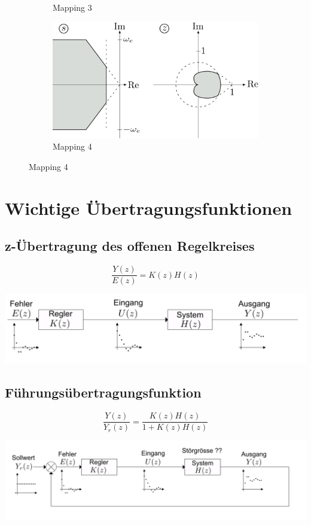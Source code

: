 \begin{figure}[th]
\begin{subfigure}[b]{0.45\textwidth}
		\caption{Mapping 3}
	\end{subfigure}
	\hfill
	\begin{subfigure}[b]{0.45\textwidth}
		\includegraphics[width=\textwidth]{./images/mapping4}
		\caption{Mapping 4}
	\end{subfigure}
\end{figure}

\section{Wichtige Übertragungsfunktionen}
\subsection{z-Übertragung des offenen Regelkreises}
\[
	\frac{Y(z)}{E(z)} = K(z)H(z)
\]
\begin{center}
	\includegraphics[width=.8\textwidth]{./images/rol}
\end{center}

\subsection{Führungsübertragungsfunktion}
\[
	\frac{Y(z)}{Y_r(z)} = \frac{K(z)H(z)}{1+K(z)H(z)}
\]
\begin{center}
	\includegraphics[width=.8\textwidth]{./images/rcl}
\end{center}


